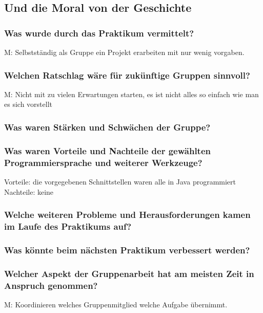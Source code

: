 \documentclass[runningheads]{llncs}
\begin{document}
\subsection{Und die Moral von der Geschichte}
\subsubsection{Was wurde durch das Praktikum vermittelt?\\}
M: Selbstständig als Gruppe ein Projekt erarbeiten mit nur wenig vorgaben.
\subsubsection{Welchen Ratschlag wäre für zukünftige Gruppen sinnvoll?\\}
M: Nicht mit zu vielen Erwartungen starten, es ist nicht alles so einfach wie man es sich vorstellt
\subsubsection{Was waren Stärken und Schwächen der Gruppe?\\}
\subsubsection{Was waren Vorteile und Nachteile der gewählten Programmiersprache und weiterer Werkzeuge?\\}
Vorteile: die vorgegebenen Schnittstellen waren alle in Java programmiert\\
Nachteile: keine
\subsubsection{Welche weiteren Probleme und Herausforderungen kamen im Laufe des Praktikums auf?\\}
\subsubsection{Was könnte beim nächsten Praktikum verbessert werden?\\}
\subsubsection{Welcher Aspekt der Gruppenarbeit hat am meisten Zeit in Anspruch genommen?\\}
M: Koordinieren welches Gruppenmitglied welche Aufgabe übernimmt.
\end{document}
